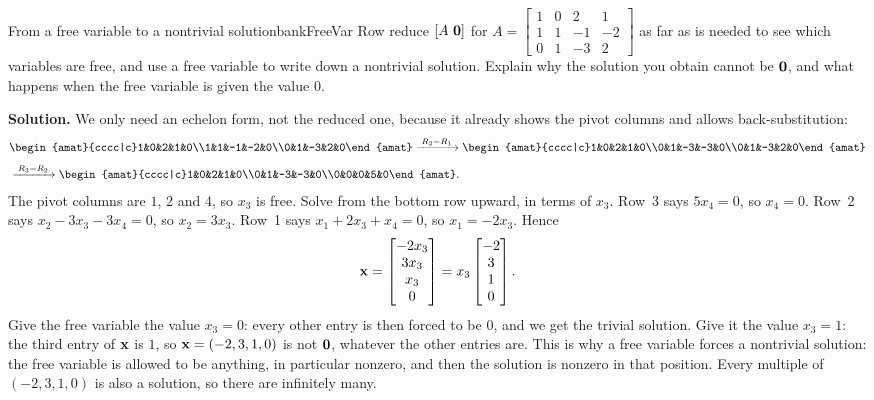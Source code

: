 \documentclass[11pt]{article}
\begin{document}
\begin{exmp}{From a free variable to a nontrivial solution}{bankFreeVar}
Row reduce $[A\ \mathbf{0}]$ for $A=\begin{bmatrix}1&0&2&1\\1&1&-1&-2\\0&1&-3&2\end{bmatrix}$ as far as is needed to see which variables are free, and use a free variable to write down a nontrivial solution. Explain why the solution you obtain cannot be $\mathbf{0}$, and what happens when the free variable is given the value $0$.

\textbf{Solution.} We only need an echelon form, not the reduced one, because it already shows the pivot columns and allows back-substitution:
\begin{align*}
&\begin{amat}{cccc|c}1&0&2&1&0\\1&1&-1&-2&0\\0&1&-3&2&0\end{amat}
\rops{R_2-R_1}
\begin{amat}{cccc|c}1&0&2&1&0\\0&1&-3&-3&0\\0&1&-3&2&0\end{amat}\\[4pt]
&\rops{R_3-R_2}
\begin{amat}{cccc|c}1&0&2&1&0\\0&1&-3&-3&0\\0&0&0&5&0\end{amat}.
\end{align*}
The pivot columns are $1$, $2$ and $4$, so $x_3$ is free. Solve from the bottom row upward, in terms of $x_3$. Row~3 says $5x_4=0$, so $x_4=0$. Row~2 says $x_2-3x_3-3x_4=0$, so $x_2=3x_3$. Row~1 says $x_1+2x_3+x_4=0$, so $x_1=-2x_3$. Hence
\[
\mathbf{x}=\begin{bmatrix}-2x_3\\3x_3\\x_3\\0\end{bmatrix}=x_3\begin{bmatrix}-2\\3\\1\\0\end{bmatrix}.
\]
Give the free variable the value $x_3=0$: every other entry is then forced to be $0$, and we get the trivial solution. Give it the value $x_3=1$: the third entry of $\mathbf{x}$ is $1$, so $\mathbf{x}=(-2,3,1,0)$ is not $\mathbf{0}$, whatever the other entries are. This is why a free variable forces a nontrivial solution: the free variable is allowed to be anything, in particular nonzero, and then the solution is nonzero in that position. Every multiple of $(-2,3,1,0)$ is also a solution, so there are infinitely many.


\end{exmp}
\end{document}
